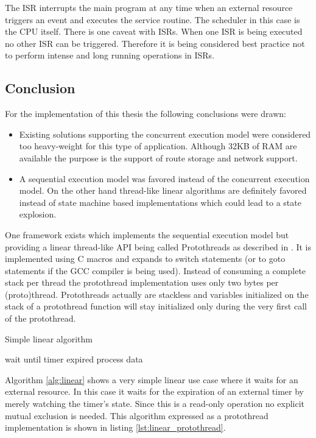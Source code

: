 The ISR interrupts the main program at any time when an external resource triggers an event and executes the service routine. The scheduler in this case is the CPU itself. There is one caveat with ISRs. When one ISR is being executed no other ISR can be triggered. Therefore it is being considered best practice not to perform intense and long running operations in ISRs.

\subsection{Conclusion}
For the implementation of this thesis the following conclusions were drawn:

\begin{itemize}
\item Existing solutions supporting the concurrent execution model were considered too heavy-weight for this type of application. Although 32KB of RAM are available the purpose is the support of route storage and network support.
\item A sequential execution model was favored instead of the concurrent execution model. On the other hand thread-like linear algorithms are definitely favored instead of state machine based implementations which could lead to a state explosion.
\end{itemize}

One framework exists which implements the sequential execution model but providing a linear thread-like API being called Protothreads as described in \cite{dunkels}. It is implemented using C macros and expands to switch statements (or to goto statements if the GCC compiler is being used). Instead of consuming a complete stack per thread the protothread implementation uses only two bytes per (proto)thread. Protothreads actually are stackless and variables initialized on the stack of a protothread function will stay initialized only during the very first call of the protothread.

\begin{algorithm}[H]
\caption{Simple linear algorithm}
\label{alg:linear}
\begin{algorithmic}
    \STATE wait until timer expired
    \STATE process data
\ENDWHILE
\end{algorithmic}
\end{algorithm}

Algorithm \ref{alg:linear} shows a very simple linear use case where it waits for an external resource. In this case it waits for the expiration of an external timer by merely watching the timer's state. Since this is a read-only operation no explicit mutual exclusion is needed. This algorithm expressed as a protothread implementation is shown in listing \ref{lst:linear_protothread}.

